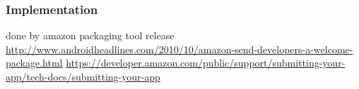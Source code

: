 \subsubsection{Implementation}\label{subsection:license-amazon-implementation}
done by amazon packaging tool\newline
release \url{http://www.androidheadlines.com/2010/10/amazon-send-developers-a-welcome-package.html}\newline
\url{https://developer.amazon.com/public/support/submitting-your-app/tech-docs/submitting-your-app}
